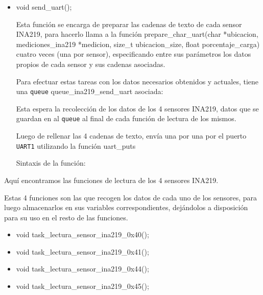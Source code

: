                 \begin{itemize} [label = ·]
                \setlength{\itemindent}{1.5em}
                
                    \item void send\_uart();\par
                        Esta función se encarga de preparar las cadenas de texto de cada sensor INA219, para hacerlo llama a la función prepare\_char\_uart(char *ubicacion, mediciones\_ina219 *medicion, size\_t ubicacion\_size, float porcentaje\_carga) cuatro veces (una por sensor), especificando entre sus parámetros los datos propios de cada sensor y sus cadenas asociadas.\par
                        Para efectuar estas tareas con los datos necesarios obtenidos y actuales, tiene una \texttt{queue} queue\_ina219\_send\_uart asociada:\par
                        
                        \par
                        
                        Esta espera la recolección de los datos de los 4 sensores INA219, datos que se guardan en al \texttt{queue} al final de cada función de lectura de los mismos.\par
                        Luego de rellenar las 4 cadenas de texto, envía una por una por el puerto \texttt{UART1} utilizando la función uart\_puts\par
                        Sintaxis de la función:\par

                        
                        
                \end{itemize}

                Aquí encontramos las funciones de lectura de los 4 sensores INA219.\par
                Estas 4 funciones son las que recogen los datos de cada uno de los sensores, para luego almacenarlos en sus variables correspondientes, dejándolos a disposición para su uso en el resto de las funciones.\par
                
                \begin{itemize} [label = ·]
                \setlength{\itemindent}{1.5em}
                
                    \item void task\_lectura\_sensor\_ina219\_0x40();
                    \item void task\_lectura\_sensor\_ina219\_0x41();
                    \item void task\_lectura\_sensor\_ina219\_0x44();
                    \item void task\_lectura\_sensor\_ina219\_0x45();
                \end{itemize}
                
